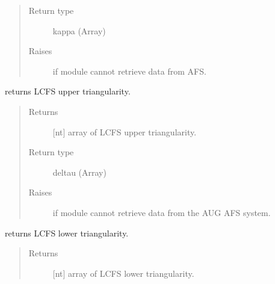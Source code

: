 \documentclass[letterpaper,10pt,english]{sphinxmanual}
\begin{document}
\begin{fulllineitems}
\begin{fulllineitems}
\begin{quote}
\begin{description}
\item[{Return type}] \leavevmode
kappa (Array)

\item[{Raises}] \leavevmode
{} \textendash{} if module cannot retrieve data from AFS.

\end{description}\end{quote}

\end{fulllineitems}


\begin{fulllineitems}
\label{\detokenize{eqtools:eqtools.AUGData.AUGDDData.getUpperTriangularity}}
returns LCFS upper triangularity.
\begin{quote}\begin{description}
\item[{Returns}] \leavevmode
{[}nt{]} array of LCFS upper triangularity.

\item[{Return type}] \leavevmode
deltau (Array)

\item[{Raises}] \leavevmode
{} \textendash{} if module cannot retrieve data from the AUG AFS system.

\end{description}\end{quote}

\end{fulllineitems}


\begin{fulllineitems}
\label{\detokenize{eqtools:eqtools.AUGData.AUGDDData.getLowerTriangularity}}
returns LCFS lower triangularity.
\begin{quote}\begin{description}
\item[{Returns}] \leavevmode
{[}nt{]} array of LCFS lower triangularity.


\end{description}
\end{quote}
\end{fulllineitems}
\end{fulllineitems}
\end{document}
